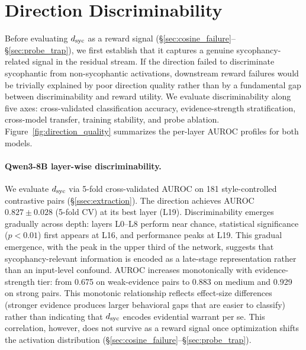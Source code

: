 \section{Direction Discriminability}
\label{sec:direction_quality}

\begin{table}[t]
\centering
\caption{Cross-model $\dsyc$ discriminability. AUROC uncertainty is 5-fold cross-validation standard deviation; evidence-strength AUROCs are evaluated on the full dataset at each model's best layer.}
\label{tab:cross_model}
\end{table}

Before evaluating $\dsyc$ as a reward signal (\S\ref{sec:cosine_failure}--\S\ref{sec:probe_trap}), we first establish that it captures a genuine sycophancy-related signal in the residual stream.
If the direction failed to discriminate sycophantic from non-sycophantic activations, downstream reward failures would be trivially explained by poor direction quality rather than by a fundamental gap between discriminability and reward utility.
We evaluate discriminability along five axes: cross-validated classification accuracy, evidence-strength stratification, cross-model transfer, training stability, and probe ablation.
Figure~\ref{fig:direction_quality} summarizes the per-layer AUROC profiles for both models.

\paragraph{Qwen3-8B layer-wise discriminability.}
We evaluate $\dsyc$ via 5-fold cross-validated AUROC on 181 style-controlled contrastive pairs (\S\ref{ssec:extraction}).
The direction achieves AUROC $0.827 \pm 0.028$ (5-fold CV) at its best layer (L19).
Discriminability emerges gradually across depth: layers L0--L8 perform near chance, statistical significance ($p < 0.01$) first appears at L16, and performance peaks at L19.
This gradual emergence, with the peak in the upper third of the network, suggests that sycophancy-relevant information is encoded as a late-stage representation rather than an input-level confound.
AUROC increases monotonically with evidence-strength tier: from 0.675 on weak-evidence pairs to 0.883 on medium and 0.929 on strong pairs.
This monotonic relationship reflects effect-size differences (stronger evidence produces larger behavioral gaps that are easier to classify) rather than indicating that $\dsyc$ encodes evidential warrant per se.
This correlation, however, does not survive as a reward signal once optimization shifts the activation distribution (\S\ref{sec:cosine_failure}--\S\ref{sec:probe_trap}).

